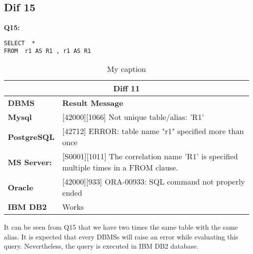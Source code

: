 \subsection{Dif 15}

\begin{mdframed}[backgroundcolor=lightgray!20] 
\textbf{Q15:}
\begin{lstlisting}
SELECT  *
FROM  r1 AS R1 , r1 AS R1
\end{lstlisting}
\end{mdframed} 

\begin{table}[h]
\centering
\caption{My caption}
\label{my-label}
\begin{tabular}{|p{2cm}|p{12cm}|}
\hline
\multicolumn{2}{|c|}{\textbf{Diff 11}}                                                                                                                            \\ \hline
\textbf{DBMS}                              & \textbf{Result Message}                                                                                              \\ \hline
{\color[HTML]{333333} \textbf{Mysql}}      & {\color[HTML]{333333} {[}42000{]}{[}1066{]} Not unique table/alias: 'R1'}                                            \\ \hline
{\color[HTML]{333333} \textbf{PostgreSQL}} & {\color[HTML]{333333} {[}42712{]} ERROR: table name "r1" specified more than once}                                   \\ \hline
{\color[HTML]{333333} \textbf{MS Server:}} & {\color[HTML]{333333} {[}S0001{]}{[}1011{]} The correlation name 'R1' is specified multiple times in a FROM clause.} \\ \hline
\textbf{Oracle}                            & {[}42000{]}{[}933{]} ORA-00933: SQL command not properly ended                                                       \\ \hline
\textbf{IBM DB2}                           & Works                                                                                                                \\ \hline
\end{tabular}
\end{table}

It can be seen from Q15 that we have two times the same table with the same alias. It is expected that every DBMSs will raise an error while evaluating this query. Nevertheless, the query is executed in IBM DB2 database. 

